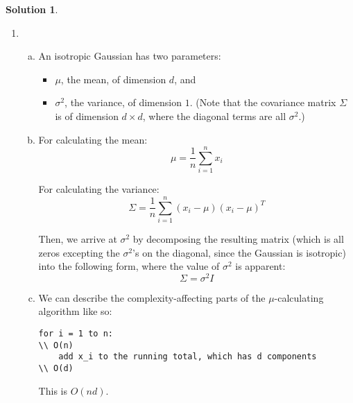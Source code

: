\documentclass{article}
\theoremstyle{definition}
\newtheorem*{solution}{Solution}
\begin{document}
\begin{solution}\
	\begin{enumerate}[1.]
    	\item %
        	\begin{enumerate}[(a)]
            	\item An isotropic Gaussian has two parameters:
                	\begin{itemize}
                    	\item $\mu$, the mean, of dimension $d$, and
                        \item $\sigma^{2}$, the variance, of dimension $1$. (Note that the covariance matrix $\Sigma$ is of dimension $d \times d$, where the diagonal terms are all $\sigma^{2}$.)
                    \end{itemize}
                    
                 \item For calculating the mean:
                 	\begin{equation*}
						\mu = \frac{1}{n} \sum_{i=1}^{n} x_i
					\end{equation*}
                    
                 	For calculating the variance:
                    \begin{equation*}
						\Sigma = \frac{1}{n} \sum_{i=1}^{n} (x_i - \mu) (x_i - \mu)^T 
					\end{equation*}
                    
                    Then, we arrive at $\sigma^{2}$ by decomposing the resulting matrix (which is all zeros excepting the $\sigma^{2}$'s on the diagonal, since the Gaussian is isotropic) into the following form, where the value of $\sigma^{2}$ is apparent:
                    \begin{equation*}
                    	\Sigma = \sigma^{2} I
                    \end{equation*}
                    
                  \item We can describe the complexity-affecting parts of the $\mu$-calculating algorithm like so:
\lstset{language=} %
\begin{lstlisting}
for i = 1 to n:																				\\ O(n)
	add x_i to the running total, which has d components							\\ O(d)
\end{lstlisting}
					This is $O(nd)$.
                

\end{enumerate}
\end{enumerate}
\end{solution}
\end{document}

